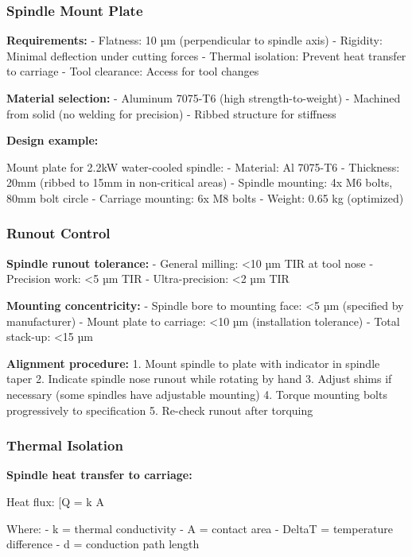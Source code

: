 \documentclass[
]{article}
\begin{document}
\subsubsection{Spindle Mount Plate}\label{spindle-mount-plate}

\textbf{Requirements:} - Flatness: 10 µm (perpendicular to spindle axis)
- Rigidity: Minimal deflection under cutting forces - Thermal isolation:
Prevent heat transfer to carriage - Tool clearance: Access for tool
changes

\textbf{Material selection:} - Aluminum 7075-T6 (high
strength-to-weight) - Machined from solid (no welding for precision) -
Ribbed structure for stiffness

\textbf{Design example:}

Mount plate for 2.2kW water-cooled spindle: - Material: Al 7075-T6 -
Thickness: 20mm (ribbed to 15mm in non-critical areas) - Spindle
mounting: 4x M6 bolts, 80mm bolt circle - Carriage mounting: 6x M8 bolts
- Weight: 0.65 kg (optimized)

\subsubsection{Runout Control}\label{runout-control}

\textbf{Spindle runout tolerance:} - General milling: \textless10 µm TIR
at tool nose - Precision work: \textless5 µm TIR - Ultra-precision:
\textless2 µm TIR

\textbf{Mounting concentricity:} - Spindle bore to mounting face:
\textless5 µm (specified by manufacturer) - Mount plate to carriage:
\textless10 µm (installation tolerance) - Total stack-up: \textless15 µm

\textbf{Alignment procedure:} 1. Mount spindle to plate with indicator
in spindle taper 2. Indicate spindle nose runout while rotating by hand
3. Adjust shims if necessary (some spindles have adjustable mounting) 4.
Torque mounting bolts progressively to specification 5. Re-check runout
after torquing

\subsubsection{Thermal Isolation}\label{thermal-isolation-1}

\textbf{Spindle heat transfer to carriage:}

Heat flux: {[}Q = k \times A \times \frac{\Delta T}{d}{]}

Where: - k = thermal conductivity - A = contact area - DeltaT =
temperature difference - d = conduction path length
\end{document}
